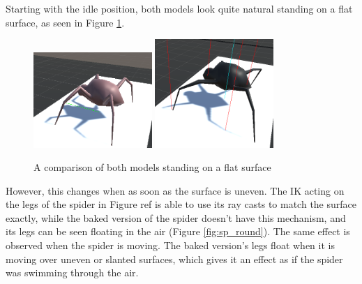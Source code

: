 Starting with the idle position, both models look quite natural standing on
a flat surface, as seen in Figure \ref{fig:sp_flat}.


\begin{figure}[h!]
    \centering
    \captionsetup{justification=centering}
    \includegraphics[width=0.4\textwidth]{grafika/sp_b_flat.png}
    \includegraphics[width=0.4\textwidth]{grafika/sp_ik_flat.png}
    \caption{A comparison of both models standing on a flat surface}
    \label{fig:sp_flat}
\end{figure}

However, this changes when as soon as the surface is uneven. The IK acting on
the legs of the spider in Figure ref is able to use its ray casts to match the
surface exactly, while the baked version of the spider doesn't have this
mechanism, and its legs can be seen floating in the air (Figure
\ref{fig:sp_round}). The same effect is observed when the spider is moving. The
baked version's legs float when it is moving over uneven or slanted surfaces,
which gives it an effect as if the spider was swimming through the air. 

